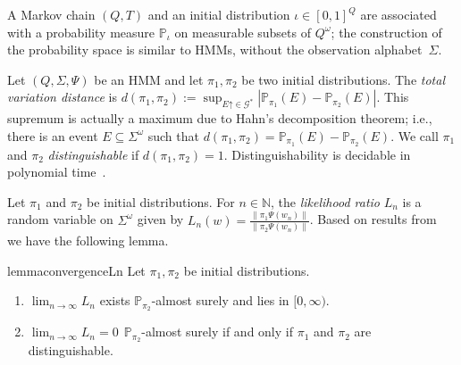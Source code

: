 \documentclass[a4paper,UKenglish,cleveref, autoref,mathscr]{lipics-v2019}
\newcommand{\NN}{\mathbb{N}}
\newcommand{\PP}{\mathbb{P}}
\newcommand{\GG}{\mathscr{G}}
\newcommand{\1}{\mathbbm{1}}
\newcommand{\uparr}[1]{#1\mathord{\uparrow}}
\begin{document}
A Markov chain $(Q,T)$ and an initial distribution $\iota \in [0,1]^Q$ are associated with a probability measure $\PP_{\iota}$ on measurable subsets of $Q^\omega$; the construction of the probability space is similar to HMMs, without the observation alphabet~$\Sigma$.

Let $(Q, \Sigma, \Psi)$ be an HMM and let $\pi_1, \pi_2$ be two initial distributions. The \emph{total variation distance} is
$d(\pi_1, \pi_2) := \sup_{\uparr{E} \in \GG^*} | \PP_{\pi_1}(E) - \PP_{\pi_2}(E) |$.
This supremum is actually a maximum due to Hahn's decomposition theorem; i.e., there is an event $E \subseteq \Sigma^\omega$ such that $d(\pi_1, \pi_2) = \PP_{\pi_1}(E) - \PP_{\pi_2}(E)$.
We call $\pi_1$ and $\pi_2$ \emph{distinguishable} if $d(\pi_1, \pi_2) = 1$.
Distinguishability is decidable in polynomial time~\cite{kief14}.



Let $\pi_1$ and $\pi_2$ be initial distributions.
For $n \in \NN$, the \emph{likelihood ratio} $L_n$ is a random variable on $\Sigma^\omega$ given by $L_n(w) = \frac{\| \pi_1 \Psi(w_n) \|}{\| \pi_2 \Psi(w_n) \|}$.
Based on results from~\cite{kief14} we have the following lemma.
\begin{restatable}{lemma}{convergenceLn}\label{convergenceLn}
Let $\pi_1, \pi_2$ be initial distributions.
\begin{enumerate}
\item $\lim_{n \rightarrow \infty} L_n$ exists $\PP_{\pi_2}$-almost surely and lies in $[0,\infty)$.
\item $\lim_{n \rightarrow \infty} L_n = 0 \ \ \PP_{\pi_2}$-almost surely if and only if $\pi_1$ and $\pi_2$ are distinguishable.
\end{enumerate}
\end{restatable}
\end{document}
